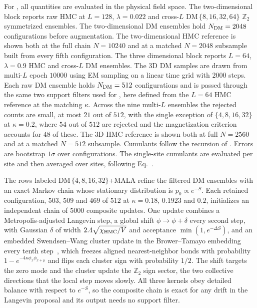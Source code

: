 \documentclass[reprint,twocolumn,superscriptaddress,preprintnumbers,amsmath,amssymb,aps,prd,floatfix]{revtex4-2}
\def\Eq#1{Eq.~\labelcref{#1}} \def\Eqs#1{Eqs.~\labelcref{#1}}
\begin{document}
For , all quantities are evaluated in the physical field space. The two-dimensional block reports raw HMC at $L=128$, $\lambda=0.022$ and cross-$L$ DM\,$\{8,16,32,64\}$ $\mathbb{Z}_2$ symmetrized ensembles. The two-dimensional DM ensembles hold $N_{\rm DM}=2048$ configurations before augmentation. The two-dimensional HMC reference is shown both at the full chain $N=10240$ and at a matched $N=2048$ subsample built from every fifth configuration. The three dimensional block reports $L=64$, $\lambda=0.9$ HMC and cross-$L$ DM ensembles. The 3D DM samples are drawn from multi-$L$ epoch $10000$ using EM sampling on a linear time grid with $2000$ steps. Each raw DM ensemble holds $N_{\rm DM}=512$ configurations and is passed through the same two support filters used for , here defined from the $L=64$ HMC reference at the matching $\kappa$. Across the nine multi-$L$ ensembles the rejected counts are small, at most $21$ out of $512$, with the single exception of $\{4,8,16,32\}$ at $\kappa=0.2$, where $54$ out of $512$ are rejected and the magnetization criterion accounts for $48$ of these. The 3D HMC reference is shown both at full $N=2560$ and at a matched $N=512$ subsample. Cumulants follow the recursion of \cite{Aarts:2024rsl}. Errors are bootstrap $1\sigma$ over configurations. The single-site cumulants are evaluated per site and then averaged over sites, following \Eq{eq:site_cumulants_avg}.

The rows labeled DM\,$\{4,8,16,32\}$+MALA refine the filtered DM ensembles with an exact Markov chain whose stationary distribution is $p_0\propto e^{-S}$. Each retained configuration, $503$, $509$ and $469$ of $512$ at $\kappa=0.18$, $0.1923$ and $0.2$, initializes an independent chain of $5000$ composite updates. One update combines a Metropolis-adjusted Langevin step, a global shift $\phi\to\phi+\delta$ every second step, with Gaussian $\delta$ of width $2.4\sqrt{\chi_{\rm HMC}/V}$ and acceptance $\min(1,e^{-\Delta S})$, and an embedded Swendsen--Wang cluster update in the Brower--Tamayo embedding every tenth step~\cite{Swendsen:1987ce,Wolff:1988uh,Brower:1989mt}, which freezes aligned nearest-neighbor bonds with probability $1-e^{-4\kappa\phi_x\phi_{x+\mu}}$ and flips each cluster sign with probability $1/2$. The shift targets the zero mode and the cluster update the $\mathbb{Z}_2$ sign sector, the two collective directions that the local step moves slowly. All three kernels obey detailed balance with respect to $e^{-S}$, so the composite chain is exact for any drift in the Langevin proposal and its output needs no support filter.
\end{document}
